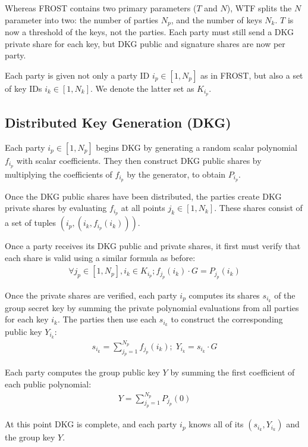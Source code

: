 \documentclass{article}
\begin{document}
Whereas FROST contains two primary parameters ($T$ and $N$), WTF splits the $N$ parameter into two: the number of parties $N_p$, and the number of keys $N_k$.  $T$ is now a threshold of the keys, not the parties.  Each party must still send a DKG private share for each key, but DKG public and signature shares are now per party.

Each party is given not only a party ID $i_p \in [1, N_p]$ as in FROST, but also a set of key IDs $i_k \in [1, N_k]$.  We denote the latter set as $K_{i_p}$.

\subsection{
  Distributed Key Generation (DKG)
}

Each party $i_p \in [1, N_p]$ begins DKG by generating a random scalar polynomial $f_{i_p}$ with scalar coefficients.  They then construct DKG public shares by multiplying the coefficients of $f_{i_p}$ by the generator, to obtain $P_{i_p}$.

Once the DKG public shares have been distributed, the parties create DKG private shares by evaluating $f_{i_p}$ at all points $j_k \in [1, N_k]$.  These shares consist of a set of tuples $(i_p, (i_k, f_{i_p}(i_k)))$.

Once a party receives its DKG public and private shares, it first must verify that each share is valid using a similar formula as before:
\begin{align}
  \forall j_p \in [1,N_p], i_k \in K_{i_p}; f_{j_p}(i_k) \cdot G = P_{j_p}(i_k)
\end{align}

Once the private shares are verified, each party $i_p$ computes its shares $s_{i_k}$ of the group secret key by summing the private polynomial evaluations from all parties for each key $i_k$. The parties then use each $s_{i_k}$ to construct the corresponding public key $Y_{i_k}$:
\begin{align}
  s_{i_k} = \sum_{j_p = 1}^{N_p} f_{j_p}(i_k) ;\; Y_{i_k} = s_{i_k} \cdot G
\end{align}

Each party computes the group public key $Y$ by summing the first coefficient of each public polynomial:
\begin{align}
  Y = \sum_{j_p=1}^{N_p} P_{j_p}(0)
\end{align}

At this point DKG is complete, and each party $i_p$ knows all of its $(s_{i_k}, Y_{i_k})$ and the group key $Y$.
\end{document}
